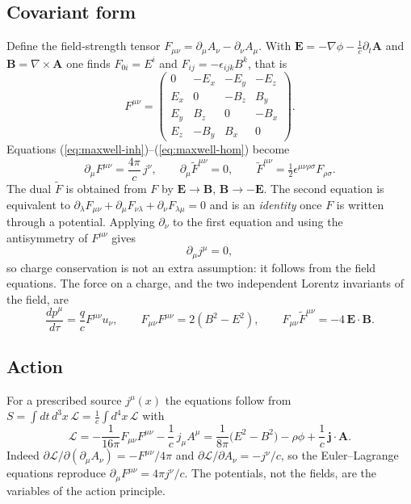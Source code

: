\documentclass[11pt,a4paper]{book}
\begin{document}
\subsection*{Covariant form}

Define the field-strength tensor $F_{\mu\nu}=\partial_\mu A_\nu-\partial_\nu A_\mu$.
With $\mathbf E=-\nabla\phi-\frac1c\partial_t\mathbf A$ and $\mathbf B=\nabla\times\mathbf A$ one finds
$F_{0i}=E^i$ and $F_{ij}=-\epsilon_{ijk}B^k$, that is
\begin{equation}
F^{\mu\nu}=\begin{pmatrix}
0&-E_x&-E_y&-E_z\\
E_x&0&-B_z&B_y\\
E_y&B_z&0&-B_x\\
E_z&-B_y&B_x&0
\end{pmatrix}.
\end{equation}
Equations (\ref{eq:maxwell-inh})--(\ref{eq:maxwell-hom}) become
\begin{equation}
\partial_\mu F^{\mu\nu}=\frac{4\pi}{c}\,j^\nu,\qquad
\partial_\mu\tilde F^{\mu\nu}=0,\qquad
\tilde F^{\mu\nu}=\tfrac12\epsilon^{\mu\nu\rho\sigma}F_{\rho\sigma}.
\label{eq:maxwell-cov}
\end{equation}
The dual $\tilde F$ is obtained from $F$ by $\mathbf E\to\mathbf B$, $\mathbf B\to-\mathbf E$.
The second equation is equivalent to
$\partial_\lambda F_{\mu\nu}+\partial_\mu F_{\nu\lambda}+\partial_\nu F_{\lambda\mu}=0$
and is an \emph{identity} once $F$ is written through a potential. Applying $\partial_\nu$
to the first equation and using the antisymmetry of $F^{\mu\nu}$ gives
\begin{equation}
\partial_\mu j^\mu=0 ,
\label{eq:continuity}
\end{equation}
so charge conservation is not an extra assumption: it follows from the field equations.
The force on a charge, and the two independent Lorentz invariants of the field, are
\begin{equation}
\frac{dp^\mu}{d\tau}=\frac qc F^{\mu\nu}u_\nu,\qquad
F_{\mu\nu}F^{\mu\nu}=2(B^2-E^2),\qquad
F_{\mu\nu}\tilde F^{\mu\nu}=-4\,\mathbf E\cdot\mathbf B .
\label{eq:invariants}
\end{equation}

\subsection*{Action}

For a prescribed source $j^\mu(x)$ the equations follow from
$S=\int dt\,d^3x\,\mathcal L=\frac1c\int d^4x\,\mathcal L$ with
\begin{equation}
\mathcal L=-\frac1{16\pi}F_{\mu\nu}F^{\mu\nu}-\frac1c\,j_\mu A^\mu
=\frac1{8\pi}\bigl(E^2-B^2\bigr)-\rho\phi+\frac1c\,\mathbf j\cdot\mathbf A .
\label{eq:lagrangian}
\end{equation}
Indeed $\partial\mathcal L/\partial(\partial_\mu A_\nu)=-F^{\mu\nu}/4\pi$ and
$\partial\mathcal L/\partial A_\nu=-j^\nu/c$, so the Euler--Lagrange equations
reproduce $\partial_\mu F^{\mu\nu}=4\pi j^\nu/c$. The potentials, not the
fields, are the variables of the action principle.
\end{document}
